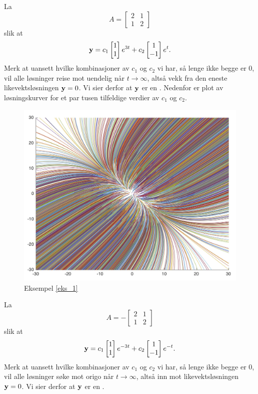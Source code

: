 \begin{ex}
\label{eks_1}
La 
\[
A=
\begin{bmatrix}
2 & 1  \\
1 & 2 
\end{bmatrix}
\]
slik at 
\[
\mathbf{y}=
c_1
\begin{bmatrix}
1  \\
1 
\end{bmatrix} e^{3t}
+
c_2
\begin{bmatrix}
1  \\
-1 
\end{bmatrix}e^{t}. 
\]
Merk at uansett hvilke kombinasjoner av $c_1$ og $c_2$ vi har, så lenge ikke begge er 0, 
vil alle løsninger reise mot uendelig når $t\to \infty$, altså vekk fra den eneste likevektsløsningen $\mathbf{y}=0$. 
Vi sier derfor at $\mathbf{y}$ er en . 
Nedenfor er plot av løsningskurver for et par tusen tilfeldige verdier av $c_1$ og $c_2$. 
\end{ex}

\begin{figure}[htbp]
  \begin{center}
	\includegraphics[scale=.1]{eks_1.jpg}
	\captionsetup{labelformat=empty}
	\caption{Eksempel \ref{eks_1}}
	\end{center}
\end{figure}


\begin{ex}
La 
\[
A=
-
\begin{bmatrix}
2 & 1  \\
1 & 2 
\end{bmatrix}
\]
slik at 
\[
\mathbf{y}=
c_1
\begin{bmatrix}
1  \\
1 
\end{bmatrix} e^{-3t}
+
c_2
\begin{bmatrix}
1  \\
-1 
\end{bmatrix}e^{-t}. 
\]
Merk at uansett hvilke kombinasjoner av $c_1$ og $c_2$ vi har, så lenge ikke begge er 0, 
vil alle løsninger søke mot origo når $t\to \infty$, altså inn mot likevektsløsningen $\mathbf{y}=0$. 
Vi sier derfor at $\mathbf{y}$ er en .
\end{ex}

